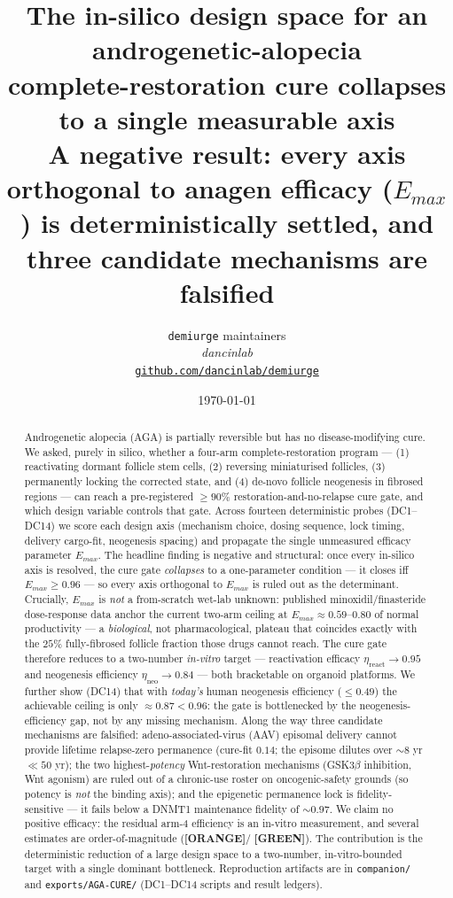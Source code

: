 \documentclass[11pt,a4paper]{article}
\title{
  \textbf{The in-silico design space for an androgenetic-alopecia\\
  complete-restoration cure collapses to a single measurable axis}\\[4pt]
  \large A negative result: every axis orthogonal to anagen efficacy ($E_{max}$)
  is deterministically settled, and three candidate mechanisms are falsified
}
\author{
  \texttt{demiurge} maintainers\\
  \normalsize\textit{dancinlab}\\[2pt]
  \normalsize\href{https://github.com/dancinlab/demiurge}{\texttt{github.com/dancinlab/demiurge}}
}
\date{\today}
\newcommand{\tierbadge}[2]{\textcolor{#1}{\textbf{[#2]}}}
\providecommand{\tierGreen}{\tierbadge{green!45!black}{GREEN}}
\providecommand{\tierOrange}{\tierbadge{orange!80!black}{ORANGE}}
\begin{document}
\maketitle

\begin{abstract}
Androgenetic alopecia (AGA) is partially reversible but has no disease-modifying
cure. We asked, purely in silico, whether a four-arm complete-restoration program
--- (1) reactivating dormant follicle stem cells, (2) reversing miniaturised
follicles, (3) permanently locking the corrected state, and (4) de-novo follicle
neogenesis in fibrosed regions --- can reach a pre-registered $\geq 90\%$
restoration-and-no-relapse cure gate, and which design variable controls that
gate. Across fourteen deterministic probes (DC1--DC14) we score each design axis
(mechanism choice, dosing sequence, lock timing, delivery cargo-fit, neogenesis
spacing) and propagate the single unmeasured efficacy parameter $E_{max}$. The
headline finding is negative and structural: once every in-silico axis is
resolved, the cure gate \emph{collapses} to a one-parameter condition --- it
closes iff $E_{max}\geq 0.96$ --- so every axis orthogonal to $E_{max}$ is ruled
out as the determinant. Crucially, $E_{max}$ is \emph{not} a from-scratch wet-lab
unknown: published minoxidil/finasteride dose-response data anchor the
current two-arm ceiling at $E_{max}\approx 0.59$--$0.80$ of normal productivity ---
a \emph{biological}, not pharmacological, plateau that coincides exactly with the
$25\%$ fully-fibrosed follicle fraction those drugs cannot reach. The cure gate
therefore reduces to a two-number \emph{in-vitro} target --- reactivation efficacy
$\eta_{\text{react}}{\to}0.95$ and neogenesis efficiency $\eta_{\text{neo}}{\to}0.84$
--- both bracketable on organoid platforms. We further show (DC14) that with
\emph{today's} human neogenesis efficiency ($\leq 0.49$) the achievable ceiling is
only $\approx 0.87 < 0.96$: the gate is bottlenecked by the neogenesis-efficiency
gap, not by any missing mechanism. Along the way three candidate mechanisms are falsified:
adeno-associated-virus (AAV) episomal delivery cannot provide lifetime
relapse-zero permanence (cure-fit $0.14$; the episome dilutes over ${\sim}8$ yr
$\ll 50$ yr); the two highest-\emph{potency} Wnt-restoration mechanisms
(GSK3$\beta$ inhibition, Wnt agonism) are ruled out of a chronic-use roster on
oncogenic-safety grounds (so potency is \emph{not} the binding axis); and the
epigenetic permanence lock is fidelity-sensitive --- it fails below a DNMT1
maintenance fidelity of ${\sim}0.97$. We claim no positive efficacy: the residual
arm-4 efficiency is an in-vitro measurement, and several estimates are
order-of-magnitude (\tierOrange / \tierGreen). The contribution is the
deterministic reduction of a large design space to a two-number, in-vitro-bounded
target with a single dominant bottleneck. Reproduction artifacts are in
\texttt{companion/} and \texttt{exports/AGA-CURE/} (DC1--DC14 scripts and result
ledgers).
\end{abstract}
\end{document}
